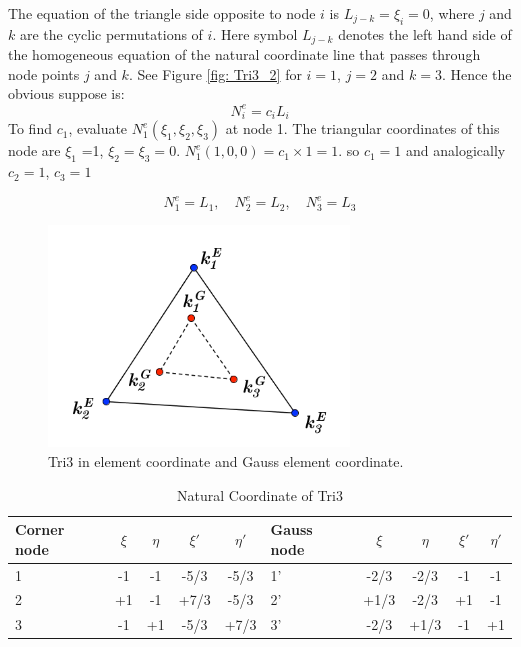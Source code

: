 \documentclass{article}
\begin{document}
The equation of the triangle side opposite to node $i$ is $L_{j-k} = \xi_i = 0$, where $j$ and $k$ are the cyclic permutations of $i$. Here symbol $L_{j-k}$ denotes the left hand side of the homogeneous equation of the natural coordinate line that passes through node points $j$ and $k$. See Figure \ref{fig: Tri3_2} for $i = 1$, $j=2$ and $k = 3$. Hence the obvious suppose is:
\begin{equation}
N_i^e = c_iL_i
\end{equation}
To find $c_1$, evaluate $N_1^e\left(\xi_1, \xi_2, \xi_3\right)$ at node 1. The triangular coordinates of this node are $\xi_1$ =1, $\xi_2 = \xi_3 = 0$.  $N_1^e\left(1,0,0\right) = c_1 \times 1 = 1$. so $c_1 = 1$ and analogically $c_2 = 1$, $c_3 = 1$

\begin{equation}
N_1^e = L_1 , \quad N_2^e = L_2, \quad N_3^e = L_3
\end{equation}


\begin{figure}[h]
	\begin{center}
		\includegraphics[width=8cm,clip]{Tri3_1.pdf}			
		\caption{Tri3 in element coordinate and Gauss element coordinate.} \label{fig: Tri3_1}
	\end{center} 
\end{figure}

\begin{table}
	\centering
	\caption{Natural Coordinate of Tri3} \label{tab: Tri3}
	\begin{tabular}{p{1cm}ccccp{1cm}cccc}	
		
		\hline
		Corner node\centering& $\xi$& $\eta$& $\xi'$& $\eta'$& Gauss node\centering& $\xi$& $\eta$& $\xi'$& $\eta'$ \\
		\hline
		1\centering& -1& -1& -5/3& -5/3& 1'\centering& -2/3& -2/3& -1& -1 \\
		2\centering& +1& -1& +7/3& -5/3& 2'\centering&+1/3 & -2/3& +1& -1 \\
		3\centering& -1& +1& -5/3& +7/3& 3'\centering& -2/3& +1/3& -1& +1\\
		\hline
		
	\end{tabular}
\end{table}			
\end{document}

